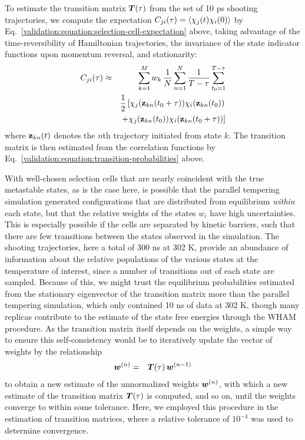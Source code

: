 To estimate the transition matrix ${\mbox{\boldmath{$T$}}}(\tau)$ from the set of 10 ps shooting trajectories, we compute the expectation $C_{ji}(\tau) = \langle \chi_j(t) \chi_i(0) \rangle$ by Eq.\ \ref{validation:equation:selection-cell-expectation} above, taking advantage of the time-reversibility of Hamiltonian trajectories, the invariance of the state indicator functions upon momentum reversal, and stationarity:
\begin{eqnarray}
C_{ji}(\tau) &\approx&  \sum_{k=1}^M w_k \, \frac{1}{N} \sum_{n=1}^N \frac{1}{T-\tau} \sum_{t_0 = 1}^{T-\tau} \nonumber \\
&& \frac{1}{2} \left[ \chi_j({\bf z}_{kn}(t_0+\tau)) \chi_i({\bf z}_{kn}(t_0)) \right. \nonumber \\
&& \left. + \chi_j({\bf z}_{kn}(t_0)) \chi_i({\bf z}_{kn}(t_0+\tau)) \right]
\end{eqnarray}
where ${\bf z}_{kn}(t)$ denotes the $n$th trajectory initiated from state $k$.
The transition matrix is then estimated from the correlation functions by Eq.\ \ref{validation:equation:transition-probabilities} above.

With well-chosen selection cells that are nearly coincident with the true metastable states, as is the case here, is possible that the parallel tempering simulation generated configurations that are distributed from equilibrium \emph{within} each state, but that the relative weights of the states $w_i$ have high uncertainties.
This is especially possible if the cells are separated by kinetic barriers, such that there are few transitions between the states observed in the simulation.
The shooting trajectories, here a total of 300 ns at 302 K, provide an abundance of information about the relative populations of the various states at the temperature of interest, since a number of transitions out of each state are sampled.
Because of this, we might trust the equilibrium probabilities estimated from the stationary eigenvector of the transition matrix more than the parallel tempering simulation, which only contained 10 ns of data at 302 K, though many replicas contribute to the estimate of the state free energies through the WHAM procedure.
As the transition matrix itself depends on the weights, a simple way to ensure this self-consistency would be to iteratively update the vector of weights by the relationship
\begin{eqnarray}
{\mbox{\boldmath{$w$}}}^{(n)} &=& {\mbox{\boldmath{$T$}}}(\tau) \, {\mbox{\boldmath{$w$}}}^{(n-1)}
\end{eqnarray}
to obtain a new estimate of the unnormalized weights ${\mbox{\boldmath{$w$}}}^{(n)}$, with which a new estimate of the transition matrix ${\mbox{\boldmath{$T$}}}(\tau)$ is computed, and so on, until the weights converge to within some tolerance.
Here, we employed this procedure in the estimation of transition matrices, where a relative tolerance of $10^{-4}$ was used to determine convergence.


